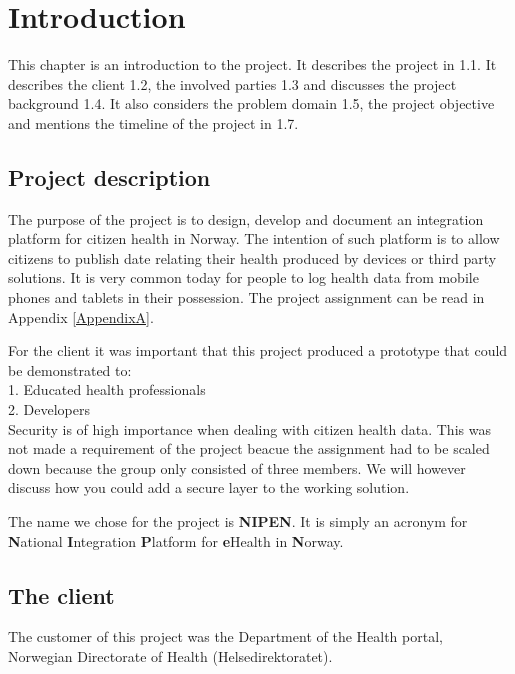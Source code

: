 \chapter{Introduction} 
\label{Introduction} 

This chapter is an introduction to the project. 
It describes the project in 1.1. It describes the client 1.2, the involved parties 1.3 and discusses the project background 1.4. 
It also considers the problem domain 1.5, the project objective and mentions the timeline of the project in 1.7.
\section{Project description}

The purpose of the project is to design, develop and document an integration platform for citizen health in Norway. 
The intention of such platform is to allow citizens to publish date relating their health produced by devices or third party solutions. 
It is very common today for people to log health data from mobile phones and tablets in their possession. The project assignment can be read in Appendix \ref{AppendixA}. 

For the client it was important that this project produced a prototype that could be demonstrated to: \\
1. Educated health professionals\\
2. Developers\\

Security is of high importance when dealing with citizen health data. This was not made a requirement of the project beacue the assignment had to be scaled down because the group only consisted of three members. 
We will however discuss how you could add a secure layer to the working solution. 

The name we chose for the project is \textbf{NIPEN}. It is simply an acronym for \textbf{N}ational \textbf{I}ntegration \textbf{P}latform for \textbf{e}Health in \textbf{N}orway.

\section{The client}

The customer of this project was the Department of the Health portal, Norwegian Directorate of Health (Helsedirektoratet).

